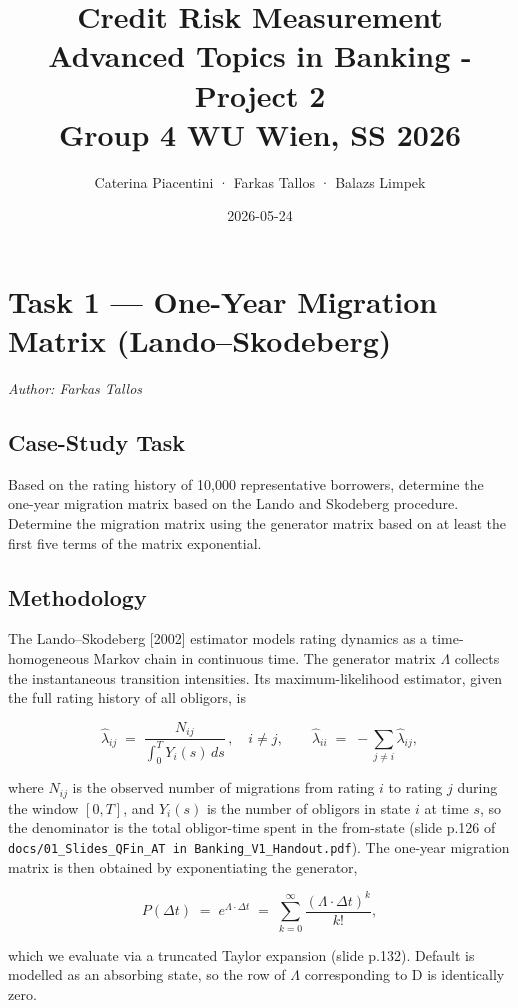 \documentclass[
  11pt,
]{article}
\title{Credit Risk Measurement\\
Advanced Topics in Banking - Project 2\\
Group 4 \textbar{} WU Wien, SS 2026}
\author{Caterina Piacentini · Farkas Tallos · Balazs Limpek}
\date{2026-05-24}
\begin{document}
\maketitle

{
\setcounter{tocdepth}{3}
\tableofcontents
}
\section{Task 1 --- One-Year Migration Matrix
(Lando--Skodeberg)}\label{task-1-one-year-migration-matrix-landoskodeberg}

\emph{Author: Farkas Tallos}

\subsection{Case-Study Task}\label{case-study-task}

Based on the rating history of 10,000 representative borrowers,
determine the one-year migration matrix based on the Lando and Skodeberg
procedure. Determine the migration matrix using the generator matrix
based on at least the first five terms of the matrix exponential.

\subsection{Methodology}\label{methodology}

The Lando--Skodeberg {[}2002{]} estimator models rating dynamics as a
time-homogeneous Markov chain in continuous time. The generator matrix
\(\Lambda\) collects the instantaneous transition intensities. Its
maximum-likelihood estimator, given the full rating history of all
obligors, is

\[
\hat\lambda_{ij} \;=\; \frac{N_{ij}}{\int_0^T Y_i(s)\,ds}\,,\quad i \neq j,
\qquad
\hat\lambda_{ii} \;=\; -\sum_{j \neq i} \hat\lambda_{ij},
\]

where \(N_{ij}\) is the observed number of migrations from rating \(i\)
to rating \(j\) during the window \([0, T]\), and \(Y_i(s)\) is the
number of obligors in state \(i\) at time \(s\), so the denominator is
the total obligor-time spent in the from-state (slide p.126 of
\texttt{docs/01\_Slides\_QFin\_AT\ in\ Banking\_V1\_Handout.pdf}). The
one-year migration matrix is then obtained by exponentiating the
generator,

\[
P(\Delta t) \;=\; e^{\Lambda \cdot \Delta t} \;=\; \sum_{k=0}^{\infty}
\frac{(\Lambda \cdot \Delta t)^k}{k!},
\]

which we evaluate via a truncated Taylor expansion (slide p.132).
Default is modelled as an absorbing state, so the row of \(\Lambda\)
corresponding to \(\mathrm{D}\) is identically zero.
\end{document}
